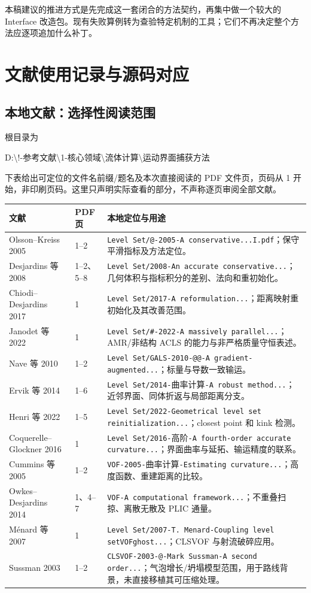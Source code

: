 \documentclass[11pt,a4paper]{article}
\newcommand{\code}[1]{{\small\nolinkurl{#1}}}
\begin{document}
本稿建议的推进方式是先完成这一套闭合的方法契约，再集中做一个较大的 Interface 改造包。现有失败算例转为查验特定机制的工具；它们不再决定整个方法应逐项追加什么补丁。

\appendix
\clearpage
\section{文献使用记录与源码对应}
\subsection{本地文献：选择性阅读范围}
根目录为\par
\noindent D:\textbackslash !-参考文献\textbackslash 1-核心领域\textbackslash 流体计算\textbackslash 运动界面捕获方法\par
下表给出可定位的文件名前缀/题名及本次直接阅读的 PDF 文件页，页码从 1 开始，非印刷页码。这里只声明实际查看的部分，不声称逐页审阅全部文献。
\begin{longtable}{L{31mm}L{21mm}L{93mm}}
\toprule 文献 & PDF 页 & 本地定位与用途\\\midrule\endhead
Olsson--Kreiss 2005 & 1--2 & \code{Level Set/@-2005-A conservative...I.pdf}；保守平滑指标及方法定位。\\
Desjardins 等 2008 & 1--2、5--8 & \code{Level Set/2008-An accurate conservative...}；几何体积与指标积分的差别、法向和重初始化。\\
Chiodi--Desjardins 2017 & 1 & \code{Level Set/2017-A reformulation...}；距离映射重初始化及其改善范围。\\
Janodet 等 2022 & 1 & \code{Level Set/\#-2022-A massively parallel...}；AMR/非结构 ACLS 的能力与非严格质量守恒表述。\\
Nave 等 2010 & 1--2 & \code{Level Set/GALS-2010-@@-A gradient-augmented...}；标量与导数一致输运。\\
Ervik 等 2014 & 1--6 & \code{Level Set/2014-}曲率计算\code{-A robust method...}；近邻界面、同体折返与局部距离分支。\\
Henri 等 2022 & 1--5 & \code{Level Set/2022-Geometrical level set reinitialization...}；closest point 和 kink 检测。\\
Coquerelle--Glockner 2016 & 1 & \code{Level Set/2016-}高阶\code{-A fourth-order accurate curvature...}；界面曲率与延拓、输运精度的联系。\\
Cummins 等 2005 & 1--2 & \code{VOF-2005-}曲率计算\code{-Estimating curvature...}；高度函数、重建距离的比较。\\
Owkes--Desjardins 2014 & 1、4--7 & \code{VOF-A computational framework...}；不重叠扫掠、离散无散及 PLIC 通量。\\
Ménard 等 2007 & 1 & \code{Level Set/2007-T. Menard-Coupling level setVOFghost...}；CLSVOF 与射流破碎应用。\\
Sussman 2003 & 1--2 & \code{CLSVOF-2003-@-Mark Sussman-A second order...}；气泡增长/坍塌模型范围，用于路线背景，未直接移植其可压缩处理。\\\bottomrule
\end{longtable}
\end{document}
